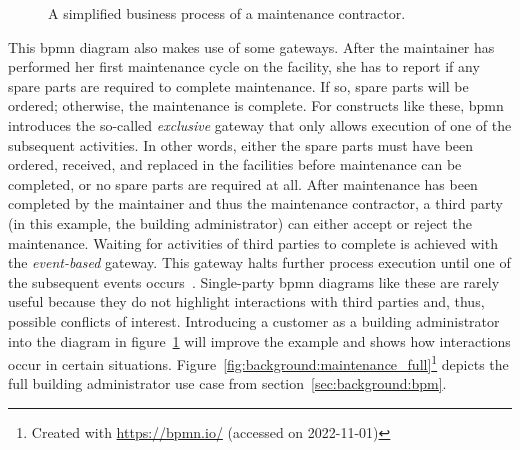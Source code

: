 \begin{figure}[h]
    \caption{A simplified business process of a maintenance contractor.}
    \label{fig:background:maintenance_contractor_only}
\end{figure}

This \gls{bpmn} diagram also makes use of some gateways. After the maintainer has performed her first maintenance cycle on the facility, she has to report if any spare parts are required to complete maintenance. If so, spare parts will be ordered; otherwise, the maintenance is complete. For constructs like these, \gls{bpmn} introduces the so-called \textit{exclusive} gateway that only allows execution of one of the subsequent activities. In other words, either the spare parts must have been ordered, received, and replaced in the facilities before maintenance can be completed, or no spare parts are required at all. After maintenance has been completed by the maintainer and thus the maintenance contractor, a third party (in this example, the building administrator) can either accept or reject the maintenance. Waiting for activities of third parties to complete is achieved with the \textit{event-based} gateway. This gateway halts further process execution until one of the subsequent events occurs~\cite{weske2012_bpm_introduction,omg2010_bpmn_by_example}. Single-party \gls{bpmn} diagrams like these are rarely useful because they do not highlight interactions with third parties and, thus, possible conflicts of interest. Introducing a customer as a building administrator into the diagram in figure~\ref{fig:background:maintenance_contractor_only} will improve the example and shows how interactions occur in certain situations. Figure~\ref{fig:background:maintenance_full}\footnote{Created with \url{https://bpmn.io/} (accessed on 2022-11-01)} depicts the full building administrator use case from section~\ref{sec:background:bpm}.

